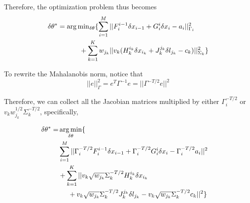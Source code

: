 

Therefore, the optimization problem thus becomes
\begin{equation}
\begin{aligned}
\delta \theta^* = 
\operatorname*{arg\,min}&_{\delta \theta}\{\sum_{i=1}^M||F_i^{i-1}\delta x_{i-1} 
+ G_i^i\delta x_i - a_i||_{\Gamma_i}^2 \\ 
&\hspace{-0.5cm}+ \sum_{k=1}^Kw_{j_k}||v_k(H_k^{i_k}\delta x_{i_k} 
 + J_k^{j_k}\delta l_{j_k} - c_k)||_{\Sigma_k}^2\}
\end{aligned}
\end{equation}

To rewrite the Mahalanobis norm, notice that
\begin{equation}
||e||_{\Gamma}^2 = e^T\Gamma^{-1}e = ||\Gamma^{-T/2}e||^2
\end{equation}

Therefore, we can collect all the Jacobian matrices multiplied by either $\Gamma_i^{-T/2}$ or $v_k w_{j_k}^{1/2}\Sigma_k^{-T/2}$, specifically,

\begin{equation}
\begin{aligned}
\delta \theta^* =& \operatorname*{arg\,min}_{\delta \theta}\{&
\\ &\sum_{i=1}^M||\Gamma_i^{-T/2}F_i^{i-1}\delta x_{i-1} + \Gamma_i^{-T/2} G_i^i\delta x_i - \Gamma_i^{-T/2}a_i||^2  \\
&+\sum_{k=1}^K||v_k\sqrt{w_{j_k}}\Sigma_k^{-T/2} H_k^{i_k}\delta x_{i_k} 
\\ &\hspace{0.5cm}+ v_k\sqrt{w_{j_k}}\Sigma_k^{-T/2}J_k^{j_k}\delta l_{j_k} 
- v_k\sqrt{w_{j_k}}\Sigma_k^{-T/2}c_k||^2\}
\end{aligned}
\end{equation}

